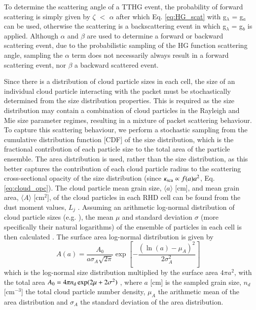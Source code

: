 \documentclass{aa}
\begin{document}
To determine the scattering angle of a TTHG event, the probability of forward scattering is simply given by $\zeta$ $<$ $\alpha$ \citep{Pfeiffer2008} after which Eq. \eqref{eq:HG_scat} with g$_{\lambda}$ = g$_{a}$ can be used, otherwise the scattering is a backscattering event in which g$_{\lambda}$ = g$_{b}$ is applied. 
Although $\alpha$ and $\beta$ are used to determine a forward or backward scattering event, due to the probabilistic sampling of the HG function scattering angle, sampling the $\alpha$ term does not necessarily always result in a forward scattering event, nor $\beta$ a backward scattered event.

Since there is a distribution of cloud particle sizes in each cell, the size of an individual cloud particle interacting with the packet must be stochastically determined from the size distribution properties.
This is required as the size distribution may contain a combination of cloud particles in the Rayleigh and Mie size parameter regimes, resulting in a mixture of packet scattering behaviour.
To capture this scattering behaviour, we perform a stochastic sampling from the cumulative distribution function [CDF] of the size distribution, which is the fractional contribution of each particle size to the total area of the particle ensemble.
The area distribution is used, rather than the size distribution, as this better captures the contribution of each cloud particle radius to the scattering cross-sectional opacity of the size distribution (since $\kappa_{\rm sca} \propto f(a)a^{2}$, Eq. \ref{eq:cloud_opc}).
The cloud particle mean grain size, $\langle a\rangle$ [cm], and mean grain area, $\langle A\rangle$ [cm$^{2}$], of the cloud particles in each RHD cell can be found from the dust moment values, $L_{j}$ \citep{Woitke2003, Woitke2004, Lee2015b}.
Assuming an arithmetic log-normal distribution of cloud particle sizes (e.g. \citealt{Ackerman2001}), the mean $\mu$ and standard deviation $\sigma$ (more specifically their natural logarithms) of the ensemble of particles in each cell is then calculated \citep[e.g.][]{Stark2015}.
The surface area log-normal distribution is given by \citep[e.g.][]{Heintzenberg1994}
\begin{equation}
A(a) = \frac{A_{0}}{a\sigma_{A}\sqrt{2\pi}}\exp\left[-\frac{(\ln(a) - \mu_{A})^{2}}{2\sigma_{A}^{2}}\right]
\end{equation}
which is the log-normal size distribution multiplied by the surface area $4\pi a^{2}$, with the total area $A_{0} = 4\pi n_{\rm d}\exp(2\mu + 2\sigma^{2})$ \citep[e.g.][]{Zender2015}, where $a$ [cm] is the sampled grain size, $n_{d}$ [cm$^{-3}$] the total cloud particle number density, $\mu_{A}$ the arithmetic mean of the area distribution and $\sigma_{A}$ the standard deviation of the area distribution.
\end{document}
